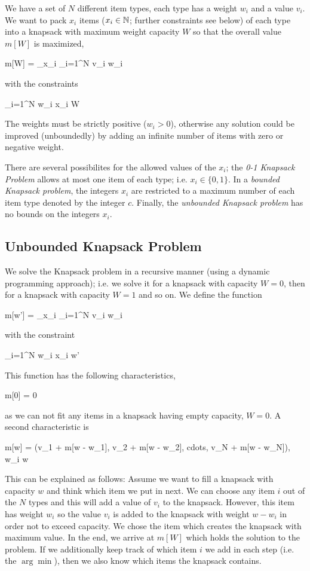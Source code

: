 
We have a set of $N$ different item types, each type has a weight $w_i$ and a value $v_i$. We want to pack $x_i$ items ($x_i \in \mathbb{N}$; further constraints see below) of each type into a knapsack with maximum weight capacity $W$ so that the overall value $m[W]$ is maximized,

\bee
m[W] = \max_{x_i} \sum_{i=1}^N v_i w_i
\eee

with the constraints

\bee
  \sum_{i=1}^N w_i x_i \leq W
\eee

The weights must be strictly positive ($w_i > 0$), otherwise any solution could be improved (unboundedly) by adding an infinite number of items with zero or negative weight.

There are several possibilites for the allowed values of the $x_i$; the \emph{0-1 Knapsack Problem} allows at most one item of each type; i.e. $x_i \in \{0,1\}$. In a \emph{bounded Knapsack problem}, the integers $x_i$ are restricted to a maximum number of each item type denoted by the integer $c$. Finally, the \emph{unbounded Knapsack problem} has no bounds on the integers $x_i$.


\subsection{Unbounded Knapsack Problem}

We solve the Knapsack problem in a recursive manner (using a dynamic programming approach); i.e. we solve it for a knapsack with capacity $W = 0$, then for a knapsack with capacity $W=1$ and so on. We define the function

\bee
m[w'] = \max_{x_i} \sum_{i=1}^N v_i w_i
\eee

with the constraint 

\bee
\sum_{i=1}^N w_i x_i \leq w'
\eee

This function has the following characteristics,

\bee
m[0] = 0
\eee

as we can not fit any items in a knapsack having empty capacity, $W = 0$. A second characteristic is

\bee
m[w] = \max(v_1 + m[w - w_1], v_2 + m[w - w_2], cdots, v_N + m[w - w_N]), \quad w_i \leq w
\eee

This can be explained as follows: Assume we want to fill a knapsack with capacity $w$ and think which item we put in next. We can choose any item $i$ out of the $N$ types and this will add a value of $v_i$ to the knapsack. However, this item has weight $w_i$ so the value $v_i$ is added to the knapsack with weight $w - w_i$ in order not to exceed capacity. We chose the item which creates the knapsack with maximum value. In the end, we arrive at $m[W]$ which holds the solution to the problem. If we additionally keep track of which item $i$ we add in each step (i.e. the $\arg \min$), then we also know which items the knapsack contains.

